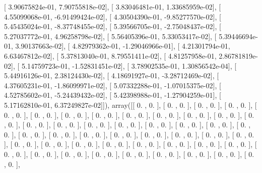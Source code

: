 \documentclass{article}
\begin{document}
       [  3.90675824e-01,   7.90755818e-02],
       [  3.83046481e-01,   1.33685959e-02],
       [  4.55099068e-01,  -6.91499424e-02],
       [  4.30504390e-01,  -9.85277570e-02],
       [  5.45435024e-01,  -8.37748455e-02],
       [  5.39566705e-01,  -2.75048437e-02],
       [  5.27037772e-01,   4.96258798e-02],
       [  5.56405396e-01,   5.33053417e-02],
       [  5.39446694e-01,   3.90137663e-02],
       [  4.82979362e-01,  -1.29046966e-01],
       [  4.21301794e-01,   6.63467812e-02],
       [  5.37813040e-01,   8.79551411e-02],
       [  4.81257958e-01,   2.86781819e-02],
       [  5.14759723e-01,  -1.52831451e-02],
       [  3.78902535e-01,   1.30856542e-04],
       [  5.44916126e-01,   2.38124430e-02],
       [  4.18691927e-01,  -3.28712469e-02],
       [  4.37605231e-01,  -1.86099971e-02],
       [  5.07332288e-01,  -1.07015375e-02],
       [  4.52785602e-01,  -5.24439432e-02],
       [  5.42398988e-01,  -1.27904259e-01],
       [  5.17162810e-01,   6.37249827e-02]]), array([[ 0.        ,  0.        ],
       [ 0.        ,  0.        ],
       [ 0.        ,  0.        ],
       [ 0.        ,  0.        ],
       [ 0.        ,  0.        ],
       [ 0.        ,  0.        ],
       [ 0.        ,  0.        ],
       [ 0.        ,  0.        ],
       [ 0.        ,  0.        ],
       [ 0.        ,  0.        ],
       [ 0.        ,  0.        ],
       [ 0.        ,  0.        ],
       [ 0.        ,  0.        ],
       [ 0.        ,  0.        ],
       [ 0.        ,  0.        ],
       [ 0.        ,  0.        ],
       [ 0.        ,  0.        ],
       [ 0.        ,  0.        ],
       [ 0.        ,  0.        ],
       [ 0.        ,  0.        ],
       [ 0.        ,  0.        ],
       [ 0.        ,  0.        ],
       [ 0.        ,  0.        ],
       [ 0.        ,  0.        ],
       [ 0.        ,  0.        ],
       [ 0.        ,  0.        ],
       [ 0.        ,  0.        ],
       [ 0.        ,  0.        ],
       [ 0.        ,  0.        ],
       [ 0.        ,  0.        ],
       [ 0.        ,  0.        ],
       [ 0.        ,  0.        ],
       [ 0.        ,  0.        ],
       [ 0.        ,  0.        ],
       [ 0.        ,  0.        ],
       [ 0.        ,  0.        ],
       [ 0.        ,  0.        ],
       [ 0.        ,  0.        ],
       [ 0.        ,  0.        ],
       [ 0.        ,  0.        ],
       [ 0.        ,  0.        ],
       [ 0.        ,  0.        ],
       [ 0.        ,  0.        ],
       [ 0.        ,  0.        ],
       [ 0.        ,  0.        ],
       [ 0.        ,  0.        ],
\end{document}
